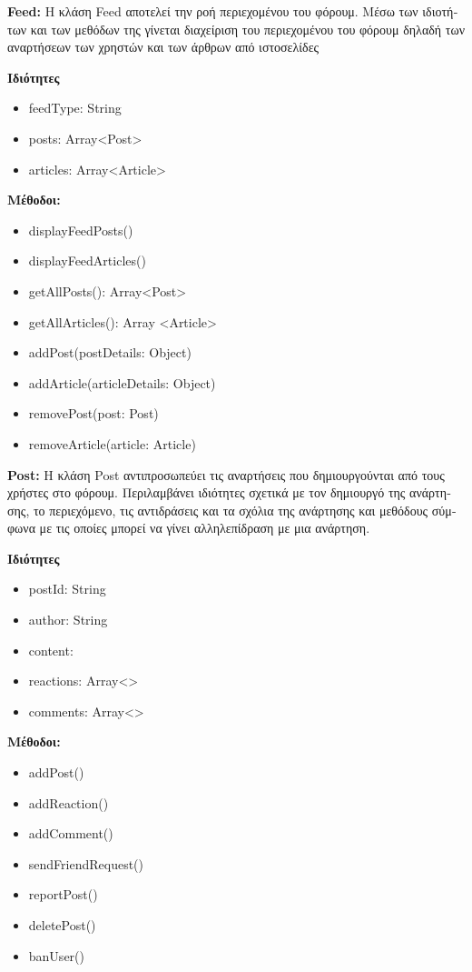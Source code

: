 \documentclass{article}
\begin{document}
\textbf{Feed:} \textgreek{Η κλάση} Feed \textgreek{αποτελεί την ροή περιεχομένου του φόρουμ. Μέσω των ιδιοτήτων και των μεθόδων της γίνεται διαχείριση του περιεχομένου του φόρουμ δηλαδή των αναρτήσεων των χρηστών και των άρθρων από ιστοσελίδες}
\newline
\newline

\textbf{\textgreek{Ιδιότητες}}
\begin{itemize}
    \item feedType: String
    \item posts: Array<Post>
    \item articles: Array<Article>
\end{itemize}
\textbf{\textgreek{Μέθοδοι:}}
\begin{itemize}
    \item displayFeedPosts()
    \item displayFeedArticles()
    \item getAllPosts(): Array<Post> 
    \item getAllArticles(): Array <Article>
    \item addPost(postDetails: Object)
    \item addArticle(articleDetails: Object)
    \item removePost(post: Post)
    \item removeArticle(article: Article)
\end{itemize}

\textbf{Post:} \textgreek{Η κλάση} Post \textgreek{αντιπροσωπεύει τις αναρτήσεις που δημιουργούνται από τους χρήστες στο φόρουμ. Περιλαμβάνει ιδιότητες σχετικά με τον δημιουργό της ανάρτησης, το περιεχόμενο, τις αντιδράσεις και τα σχόλια της ανάρτησης και μεθόδους σύμφωνα με τις οποίες μπορεί να γίνει αλληλεπίδραση με μια ανάρτηση.}
\newline
\newline

\textbf{\textgreek{Ιδιότητες}}
\begin{itemize}
    \item postId: String
    \item author: String
    \item content:
    \item reactions: Array<>
    \item comments: Array<>
\end{itemize}
\textbf{\textgreek{Μέθοδοι:}}
\begin{itemize}
    \item addPost()
    \item addReaction()
    \item addComment()
    \item sendFriendRequest()
    \item reportPost()
    \item deletePost()
    \item banUser()
\end{itemize}
\end{document}
